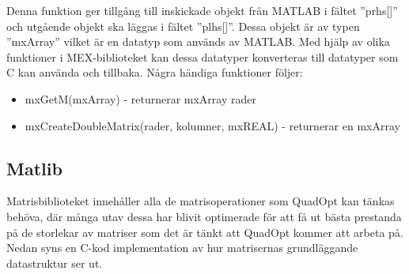 Denna funktion ger tillgång till inskickade objekt från MATLAB i fältet ''prhs[]'' och utgående objekt ska läggas i fältet ''plhs[]''. Dessa objekt är av typen ''mxArray'' vilket är en datatyp som används av MATLAB. Med hjälp av olika funktioner i MEX-biblioteket kan dessa datatyper konverteras till datatyper som C kan använda och tillbaka. Några händiga funktioner följer:
\begin{itemize}
\item mxGetM(mxArray) - returnerar mxArray rader
\item mxCreateDoubleMatrix(rader, kolumner, mxREAL) - returnerar en mxArray
\end{itemize}



\subsection{Matlib}
Matrisbiblioteket innehåller alla de matrisoperationer som QuadOpt kan tänkas behöva, där många utav dessa har blivit optimerade för att få ut bästa prestanda på de storlekar av matriser som det är tänkt att QuadOpt kommer att arbeta på. Nedan syns en C-kod implementation av hur matrisernas grundläggande datastruktur ser ut. %




